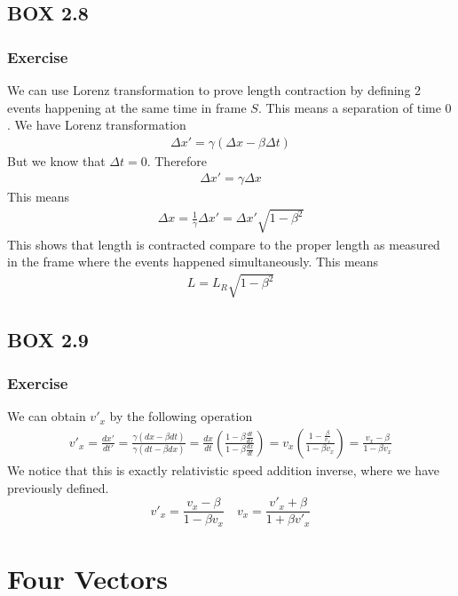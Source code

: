 \documentclass[12pt]{memoir}
\newcommand{\dydx}[2]{\frac{d #1}{d #2}}
\newcommand{\paren}[1]{\left( #1 \right)}
\begin{document}
    \section{BOX 2.8}
        \subsection{Exercise}
        We can use Lorenz transformation to prove length contraction by defining 2 events happening at the same time in frame $S$. This means a separation of time $0$. We have Lorenz transformation
        \begin{align}
        \Delta x' = \gamma\paren{\Delta x - \beta\Delta t}
        \end{align}
        But we know that $\Delta t = 0$. Therefore
        \begin{align}
        \Delta x' = \gamma\Delta x
        \end{align}
        This means
        \begin{align}
        \Delta x = \frac{1}{\gamma}\Delta x' = \Delta x'\sqrt{1-\beta^2}
        \end{align}
        This shows that length is contracted compare to the proper length as measured in the frame where the events happened simultaneously. This means
        \begin{align}
        L = L_R\sqrt{1-\beta^2}
        \end{align}
\newpage
    \section{BOX 2.9}
        \subsection{Exercise}
        We can obtain $v'_x$ by the following operation
        \begin{align}
        v'_x = \frac{dx'}{dt'}=\frac{\gamma(dx - \beta dt)}{\gamma(dt - \beta dx)} = \dydx{x}{t}\paren{\frac{1-\beta\frac{dt}{dx}}{1-\beta\frac{dx}{dt}}}= v_x\paren{\frac{1-\frac{\beta}{v_x}}{1-\beta v_x}} = \frac{v_x - \beta}{1 - \beta v_x}
        \end{align}
        We notice that this is exactly relativistic speed addition inverse, where we have previously defined. 
        \[
        v'_x = \frac{v_x - \beta}{1 - \beta v_x} \quad v_x = \frac{v'_x + \beta}{1 + \beta v'_x}
        \]

\begingroup
\let\clearpage\relax
\chapter{Four Vectors}
\endgroup
\end{document}

